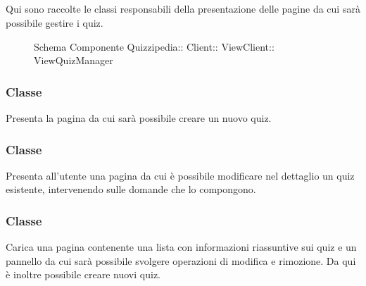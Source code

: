 \subsection{}
Qui sono raccolte le classi responsabili della presentazione delle pagine da cui sarà possibile gestire i quiz.
\begin{figure}[H]
\centering
\noindent{}
\caption[Schema Componente ViewQuizManager]{Schema Componente Quizzipedia:: Client:: ViewClient:: ViewQuizManager}
\end{figure}
\subsubsection{Classe }
Presenta la pagina da cui sarà possibile creare un nuovo quiz.
\begin{itemize}
\end{itemize}
\subsubsection{Classe }
Presenta all'utente una pagina da cui è possibile modificare nel dettaglio un quiz esistente, intervenendo sulle domande che lo compongono.
\begin{itemize}
\end{itemize}
\subsubsection{Classe }
Carica una pagina contenente una lista con informazioni riassuntive sui quiz e un pannello da cui sarà possibile svolgere operazioni di modifica e rimozione. Da qui è inoltre possibile creare nuovi quiz.
\begin{itemize}
\end{itemize}
